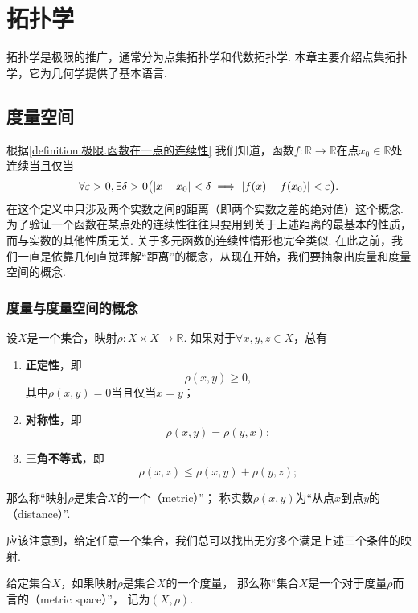 \chapter{拓扑学}
拓扑学是极限的推广，通常分为点集拓扑学和代数拓扑学.
本章主要介绍点集拓扑学，它为几何学提供了基本语言.

\section{度量空间}
根据\cref{definition:极限.函数在一点的连续性} 我们知道，函数\(f\colon\mathbb{R}\to\mathbb{R}\)在点\(x_0\in\mathbb{R}\)处连续当且仅当\[
\forall\varepsilon>0,
\exists\delta>0
\bigl(
\abs{x - x_0}<\delta
\implies
\abs{f(x) - f(x_0)} < \varepsilon
\bigr).
\]
在这个定义中只涉及两个实数之间的距离（即两个实数之差的绝对值）这个概念.
为了验证一个函数在某点处的连续性往往只要用到关于上述距离的最基本的性质，而与实数的其他性质无关.
关于多元函数的连续性情形也完全类似.
在此之前，我们一直是依靠几何直觉理解“距离”的概念，从现在开始，我们要抽象出度量和度量空间的概念.

\subsection{度量与度量空间的概念}
\begin{definition}
设\(X\)是一个集合，映射\(\rho\colon X \times X\to\mathbb{R}\).
如果对于\(\forall x,y,z \in X\)，总有\begin{enumerate}
\item {\bf 正定性}，即\[
\rho(x,y)\geqslant0,
\]其中\(\rho(x,y)=0\)当且仅当\(x=y\)；

\item {\bf 对称性}，即\[
\rho(x,y) = \rho(y,x);
\]

\item {\bf 三角不等式}，即\[
\rho(x,z) \leqslant \rho(x,y) + \rho(y,z);
\]
\end{enumerate}
那么称“映射\(\rho\)是集合\(X\)的一个（metric）”；
称实数\(\rho(x,y)\)为“从点\(x\)到点\(y\)的（distance）”.
\end{definition}

应该注意到，给定任意一个集合，我们总可以找出无穷多个满足上述三个条件的映射.

\begin{definition}
给定集合\(X\)，如果映射\(\rho\)是集合\(X\)的一个度量，
那么称“集合\(X\)是一个对于度量\(\rho\)而言的（metric space）”，
记为\((X,\rho)\).
\end{definition}

